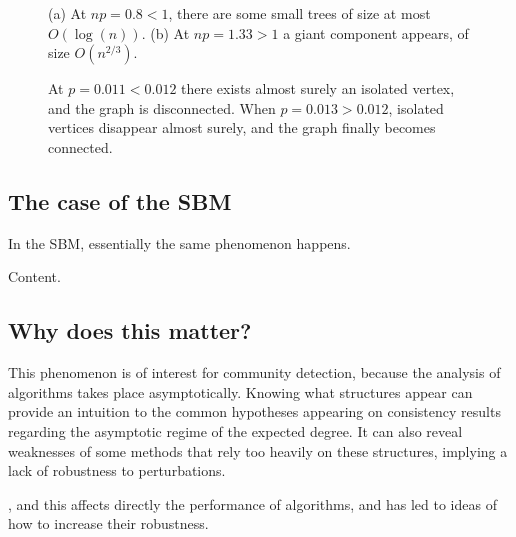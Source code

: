 \documentclass[../../main.tex]{subfiles} %
\begin{document}
\begin{figure}
	\centering
	\begin{subfigure}{.55\textwidth}
		\centering
		\caption{}
		\label{fig:er-giant-0}
	\end{subfigure}
	\hfill
	\begin{subfigure}{.55\textwidth}
		\centering
		\caption{}
		\label{fig:er-giant-1}
	\end{subfigure}
	\caption{(a) At \(np = 0.8 < 1\), there are some small trees of size at 
		most \(O(\log(n))\). (b) At \(np = 1.33 > 1\) a giant component 
		appears, of 
		size \(O(n^{2/3})\).}
	\label{fig:test1}
\end{figure}

\begin{figure}
	\centering
	\caption{At \(p = 0.011 < 0.012\) there exists almost surely an 
		isolated vertex, and the graph is disconnected. When \(p = 0.013 > 
		0.012\), isolated vertices disappear almost surely, and the graph 
		finally becomes connected.}
	\label{fig:er-connectivity-0}
\end{figure}

\subsection{The case of the SBM}  %
In the SBM, essentially the same phenomenon happens.
\begin{proposition}
	Content.
\end{proposition}

\subsection{Why does this matter?}  %
This phenomenon is of interest for community detection, because the analysis 
of algorithms takes place asymptotically. Knowing what structures appear can 
provide an intuition to the common hypotheses appearing on consistency 
results regarding the asymptotic regime of the expected degree. It can also 
reveal weaknesses of some methods that rely too heavily on these structures, 
implying a lack of robustness to perturbations.


, and this affects directly 
the performance of algorithms, and has led to ideas of how to increase their 
robustness.
\end{document}
